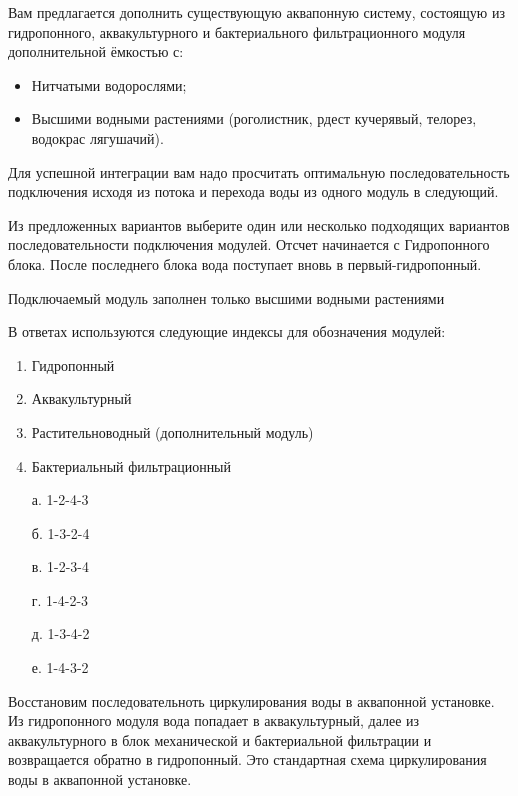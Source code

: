 
Вам предлагается дополнить существующую аквапонную систему, состоящую из гидропонного, аквакультурного и бактериального фильтрационного модуля дополнительной ёмкостью с:

\begin{itemize}
    \item Нитчатыми водорослями;
    \item Высшими водными растениями (роголистник, рдест кучерявый, телорез, водокрас лягушачий).
\end{itemize}

Для успешной интеграции вам надо просчитать оптимальную последовательность подключения исходя из потока и перехода воды из одного модуль в следующий.

Из предложенных вариантов выберите один или несколько подходящих вариантов последовательности подключения модулей. Отсчет начинается с Гидропонного блока. После последнего блока вода поступает вновь в первый-гидропонный.

Подключаемый модуль заполнен только высшими водными растениями

В ответах используются следующие индексы для обозначения модулей:

\begin{enumerate}
    \item Гидропонный
    \item Аквакультурный
    \item Растительноводный (дополнительный модуль)
    \item Бактериальный фильтрационный
\end{enumerate}

\begin{enumerate}
    \item[а.] 1-2-4-3
    \item[б.] 1-3-2-4
    \item[в.] 1-2-3-4
    \item[г.] 1-4-2-3
    \item[д.] 1-3-4-2
    \item[е.] 1-4-3-2
\end{enumerate}

\explanationSection

Восстановим последовательноть циркулирования воды в аквапонной установке. Из гидропонного модуля вода попадает в аквакультурный, далее из аквакультурного в блок механической и бактериальной фильтрации и возвращается обратно в гидропонный. Это стандартная схема циркулирования воды в аквапонной установке. 

